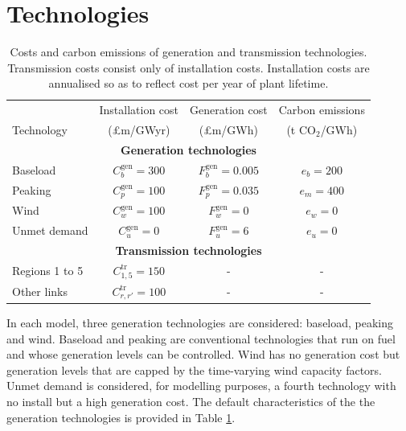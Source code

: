 \documentclass[preprint]{elsarticle}
\begin{document}
\section{Technologies}
\begin{table}
  \centering
\begin{tabular}{ l  c  c  c}
\small
& Installation cost & Generation cost & Carbon emissions\\
Technology &(\pounds m/GWyr) &(\pounds m/GWh) & (t CO$_2$/GWh) \\ \hline
\multicolumn{4}{c}{\textbf{Generation technologies}} \\  
Baseload & $C_b^\text{gen} = 300$ & $F_b^\text{gen} = 0.005$ & $e_b = 200$ \\
Peaking & $C_p^\text{gen} = 100$ & $F_p^\text{gen} = 0.035$ & $e_m = 400$ \\
Wind & $C_w^\text{gen} = 100$ & $F_w^\text{gen} = 0$ & $e_w = 0$ \\
Unmet demand & $C_u^\text{gen} = 0$ & $F_u^\text{gen} = 6$ & $e_u = 0$ \\
\multicolumn{4}{c}{\textbf{Transmission technologies}} \\  
Regions 1 to 5 & $C_{1,5}^\text{tr} = 150$ & - & - \\
Other links & $C_{r,r'}^\text{tr} = 100$ & - & - \\ \hline
\end{tabular} \vspace{1em}
\caption{Costs and carbon emissions of generation and transmission technologies. Transmission costs consist only of installation costs. Installation costs are annualised so as to reflect cost per year of plant lifetime.}
\label{table:tech_characteristics}
\end{table}

\noindent In each model, three generation technologies are considered: baseload, peaking and wind. Baseload and peaking are conventional technologies that run on fuel and whose generation levels can be controlled. Wind has no generation cost but generation levels that are capped by the time-varying wind capacity factors. Unmet demand is considered, for modelling purposes, a fourth technology with no install but a high generation cost. The default characteristics of the the generation technologies is provided in Table \ref{table:tech_characteristics}. \\
\end{document}
